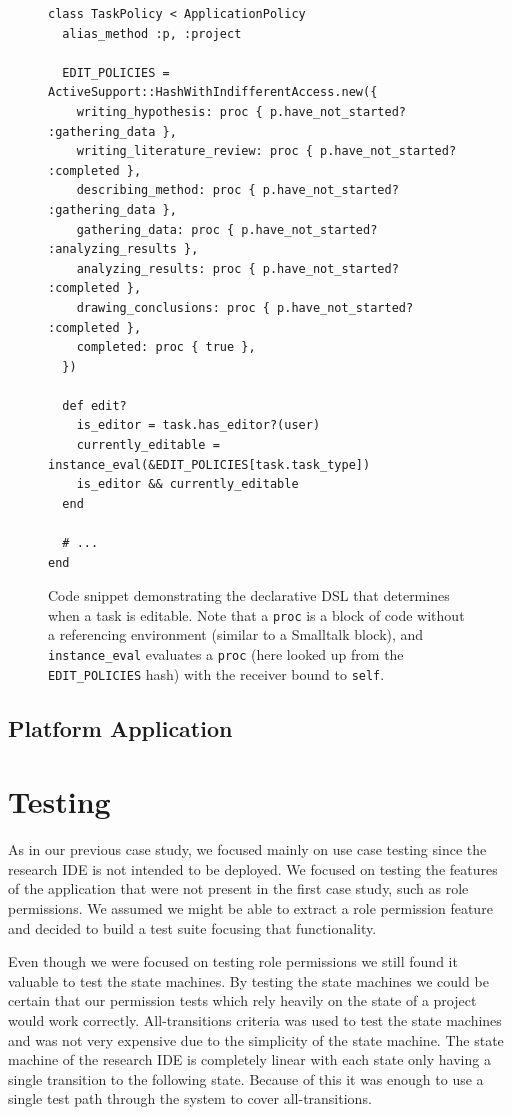 \documentclass[document.tex]{subfiles}
\begin{document}
\begin{figure}[!ht]
  \begin{lstlisting}
class TaskPolicy < ApplicationPolicy
  alias_method :p, :project

  EDIT_POLICIES = ActiveSupport::HashWithIndifferentAccess.new({
    writing_hypothesis: proc { p.have_not_started? :gathering_data },
    writing_literature_review: proc { p.have_not_started? :completed },
    describing_method: proc { p.have_not_started? :gathering_data },
    gathering_data: proc { p.have_not_started? :analyzing_results },
    analyzing_results: proc { p.have_not_started? :completed },
    drawing_conclusions: proc { p.have_not_started? :completed },
    completed: proc { true },
  })

  def edit?
    is_editor = task.has_editor?(user)
    currently_editable = instance_eval(&EDIT_POLICIES[task.task_type])
    is_editor && currently_editable
  end

  # ...
end
  \end{lstlisting}
  \cprotect\caption{Code snippet demonstrating the declarative DSL that determines when a task is editable. Note that a \verb!proc! is a block of code without a referencing environment (similar to a Smalltalk block), and \verb!instance_eval! evaluates a \verb!proc! (here looked up from the \verb!EDIT_POLICIES! hash) with the receiver bound to \verb!self!.}
  \label{fig:case-research-state-based-policy}
\end{figure}

\FloatBarrier


\subsection {Platform Application}



\section {Testing}

As in our previous case study, we focused mainly on use case testing since the research IDE is not intended to be deployed. We focused on testing the features of the application that were not present in the first case study, such as role permissions. We assumed we might be able to extract a role permission feature and decided to build a test suite focusing that functionality.

Even though we were focused on testing role permissions we still found it valuable to test the state machines. By testing the state machines we could be certain that our permission tests which rely heavily on the state of a project would work correctly. All-transitions criteria was used to test the state machines and was not very expensive due to the simplicity of the state machine. The state machine of the research IDE is completely linear with each state only having a single transition to the following state. Because of this it was enough to use a single test path through the system to cover all-transitions.
\end{document}
